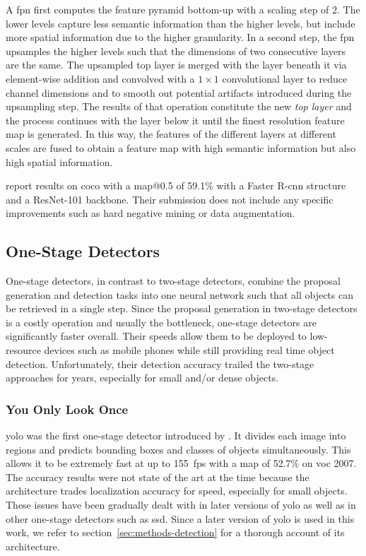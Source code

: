 \documentclass[draft,final]{vutinfth} %
\begin{document}
A \gls{fpn} first computes the feature pyramid bottom-up with a
scaling step of 2. The lower levels capture less semantic information
than the higher levels, but include more spatial information due to
the higher granularity. In a second step, the \gls{fpn} upsamples the
higher levels such that the dimensions of two consecutive layers are
the same. The upsampled top layer is merged with the layer beneath it
via element-wise addition and convolved with a $1\times 1$ convolutional
layer to reduce channel dimensions and to smooth out potential
artifacts introduced during the upsampling step. The results of that
operation constitute the new \emph{top layer} and the process
continues with the layer below it until the finest resolution feature
map is generated. In this way, the features of the different layers at
different scales are fused to obtain a feature map with high semantic
information but also high spatial information.

\textcite{lin2017} report results on \gls{coco} with a \gls{map}@0.5
of 59.1\% with a Faster R-\gls{cnn} structure and a ResNet-101
backbone. Their submission does not include any specific improvements
such as hard negative mining \cite{shrivastava2016} or data
augmentation.

\subsection{One-Stage Detectors}
\label{ssec:theory-one-stage}

One-stage detectors, in contrast to two-stage detectors, combine the
proposal generation and detection tasks into one neural network such
that all objects can be retrieved in a single step. Since the proposal
generation in two-stage detectors is a costly operation and usually
the bottleneck, one-stage detectors are significantly faster
overall. Their speeds allow them to be deployed to low-resource
devices such as mobile phones while still providing real time object
detection. Unfortunately, their detection accuracy trailed the
two-stage approaches for years, especially for small and/or dense
objects.

\subsubsection{You Only Look Once}
\label{sssec:theory-yolo}

\gls{yolo} was the first one-stage detector introduced by
\textcite{redmon2016}. It divides each image into regions and predicts
bounding boxes and classes of objects simultaneously. This allows it
to be extremely fast at up to \qty{155}{fps} with a \gls{map} of
52.7\% on \gls{voc} 2007. The accuracy results were not state of the
art at the time because the architecture trades localization accuracy
for speed, especially for small objects. These issues have been
gradually dealt with in later versions of \gls{yolo} as well as in
other one-stage detectors such as \gls{ssd}. Since a later version of
\gls{yolo} is used in this work, we refer to
section~\ref{sec:methods-detection} for a thorough account of its
architecture.
\end{document}
